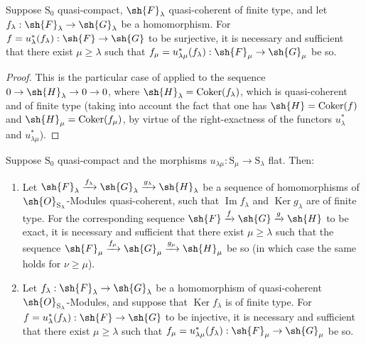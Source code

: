 \begin{corollary}[8.5.7]
\label{IV.8.5.7}
Suppose $\mathrm{S}_0$ quasi-compact, $\sh{F}_\lambda$ quasi-coherent of finite type, and let $f_\lambda:\sh{F}_\lambda\to\sh{G}_\lambda$ be a homomorphism.
For $f=u_\lambda^*(f_\lambda):\sh{F}\to\sh{G}$ to be surjective, it is necessary and sufficient that there exist $\mu\geqslant\lambda$ such that $f_\mu=u_{\lambda\mu}^*(f_\lambda):\sh{F}_\mu\to\sh{G}_\mu$ be so.
\end{corollary}

\begin{proof}
This is the particular case of  applied to the sequence $0\to\sh{H}_\lambda\to 0\to 0$, where $\sh{H}_\lambda=\operatorname{Coker}(f_\lambda)$, which is quasi-coherent and of finite type (taking into account the fact that one has $\sh{H}=\operatorname{Coker}(f)$ and $\sh{H}_\mu=\operatorname{Coker}(f_\mu)$, by virtue of the right-exactness of the functors $u_\lambda^*$ and $u_{\lambda\mu}^*$).
\end{proof}

\begin{corollary}[8.5.8]
\label{IV.8.5.8}
Suppose $\mathrm{S}_0$ quasi-compact and the morphisms $u_{\lambda\mu}:\mathrm{S}_\mu\to\mathrm{S}_\lambda$ flat.
Then:
\begin{enumerate}[label=(\roman*)]
  \item Let $\sh{F}_\lambda\xrightarrow{f_\lambda}\sh{G}_\lambda\xrightarrow{g_\lambda}\sh{H}_\lambda$ be a sequence of homomorphisms of $\sh{O}_{\mathrm{S}_\lambda}$-Modules quasi-coherent, such that $\operatorname{Im} f_\lambda$ and $\operatorname{Ker} g_\lambda$ are of finite type.
For the corresponding sequence $\sh{F}\xrightarrow{f}\sh{G}\xrightarrow{g}\sh{H}$ to be
exact, it is necessary and sufficient that there exist $\mu\geqslant\lambda$ such that the sequence $\sh{F}_\mu\xrightarrow{f_\mu}\sh{G}_\mu\xrightarrow{g_\mu}\sh{H}_\mu$ be so (in which case the same holds for $\nu\geqslant\mu$).
  \item Let $f_\lambda:\sh{F}_\lambda\to\sh{G}_\lambda$ be a homomorphism of quasi-coherent $\sh{O}_{\mathrm{S}_\lambda}$-Modules, and suppose that $\operatorname{Ker} f_\lambda$ is of finite type.
For $f=u_\lambda^*(f_\lambda):\sh{F}\to\sh{G}$ to be injective, it is necessary and sufficient that there exist $\mu\geqslant\lambda$ such that $f_\mu=u_{\lambda\mu}^*(f_\lambda):\sh{F}_\mu\to\sh{G}_\mu$ be so.
\end{enumerate}
\end{corollary}

